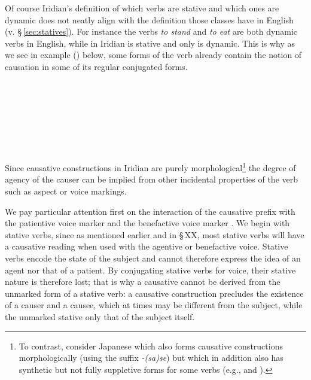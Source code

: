 Of course Iridian's definition of which verbs are stative and which ones are
dynamic does not neatly align with the definition those
classes have in English (v. \S\,\ref{sec:statives}). For instance
the verbs \emph{to stand} and \emph{to eat} are both dynamic verbs in
English, while in Iridian 
is stative and only  is dynamic. This is why as we see in
example () below, some forms of the verb 
already contain the notion of causation in some of its regular conjugated forms.

\pex
\a  {}\\
	\\
    \\
    \\
\a  {}\\
    \\
\xe

Since causative constructions in Iridian are purely morphological\footnote{To
contrast, consider Japanese which also forms causative
constructions morphologically (using the suffix \emph{-(sa)se}) but which in
addition also has synthetic but not fully suppletive forms for some verbs (e.g.,
 and ).} the degree of agency of the
causer can be implied from other incidental properties of the verb such as
aspect or voice markings.

We pay particular attention first on the interaction of the causative prefix
 with the patientive voice marker  and the benefactive voice
marker . We begin with stative verbs, since as mentioned earlier and in
\S\,XX, most stative verbs will have a causative reading when used with the
agentive or benefactive voice. Stative verbs encode the state of the subject and
cannot therefore express the idea of an agent nor that of a patient. By
conjugating stative verbs for voice, their stative nature is therefore lost;
that is why a causative cannot be derived from the unmarked form of a stative
verb: a causative construction precludes the existence of a causer and a causee,
which at times may be different from the subject, while the unmarked stative
only that of the subject itself.


